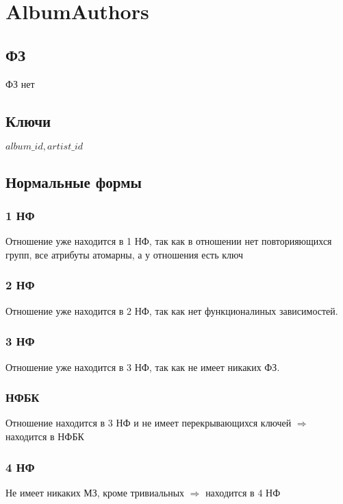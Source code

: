 \documentclass{article}
\begin{document}
\section{AlbumAuthors}

\subsection{ФЗ}
ФЗ нет

\subsection{Ключи}
${album\_id, artist\_id}$

\subsection{Нормальные формы}

\subsubsection{1 НФ}

Отношение уже находится в 1 НФ, так как в отношении нет повторияющихся групп, все атрибуты атомарны, а у отношения есть ключ

\subsubsection{2 НФ}

Отношение уже находится в 2 НФ, так как нет функционалиных зависимостей.

\subsubsection{3 НФ}

Отношение уже находится в 3 НФ, так как не имеет никаких ФЗ.

\subsubsection{НФБК}

Отношение находится в 3 НФ и не имеет перекрывающихся ключей $\Rightarrow$ находится в НФБК

\subsubsection{4 НФ}

Не имеет никаких МЗ, кроме тривиальных $\Rightarrow$ находится в 4 НФ
\end{document}
